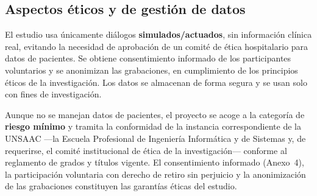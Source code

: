 
\subsection{Aspectos {\'e}ticos y de gesti{\'o}n de datos}
El estudio usa {\'u}nicamente di{\'a}logos \textbf{simulados/actuados}, sin informaci{\'o}n cl{\'i}nica
real, evitando la necesidad de aprobaci{\'o}n de un comit{\'e} de {\'e}tica hospitalario para datos de
pacientes. Se obtiene consentimiento informado de los participantes voluntarios y se anonimizan las
grabaciones, en cumplimiento de los principios {\'e}ticos de la investigaci{\'o}n. Los datos se
almacenan de forma segura y se usan solo con fines de investigaci{\'o}n.

\begin{bloqueObsCuatro}
\noindent Aunque no se manejan datos de pacientes, el proyecto se acoge a la categor{\'i}a de
\textbf{riesgo m{\'i}nimo} y tramita la conformidad de la instancia correspondiente de la UNSAAC
---la Escuela Profesional de Ingenier{\'i}a Inform{\'a}tica y de Sistemas y, de requerirse, el
comit{\'e} institucional de {\'e}tica de la investigaci{\'o}n--- conforme al reglamento de grados y
t{\'i}tulos vigente. El consentimiento informado (Anexo~4), la participaci{\'o}n voluntaria con
derecho de retiro sin perjuicio y la anonimizaci{\'o}n de las grabaciones constituyen las garant{\'i}as
{\'e}ticas del estudio.
\end{bloqueObsCuatro}

